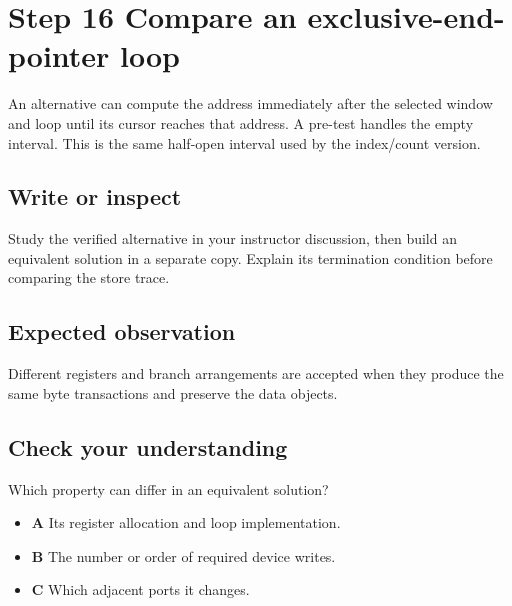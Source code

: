 \section{Step 16 Compare an exclusive-end-pointer
  loop}\label{005-seven-segment-counter-s16-step-16-compare-an-exclusive-end-pointer-loop}

An alternative can compute the address immediately after the selected
window and loop until its cursor reaches that address. A pre-test
handles the empty interval. This is the same half-open interval used by
the index/count version.

\subsection{Write or
  inspect}\label{005-seven-segment-counter-s16-write-or-inspect}

Study the verified alternative in your instructor discussion, then build
an equivalent solution in a separate copy. Explain its termination
condition before comparing the store trace.

\subsection{Expected
  observation}\label{005-seven-segment-counter-s16-expected-observation}

Different registers and branch arrangements are accepted when they
produce the same byte transactions and preserve the data objects.

\subsection{Check your
  understanding}\label{005-seven-segment-counter-s16-check-your-understanding}

Which property can differ in an equivalent solution?

\begin{itemize}
  \tightlist
  \item
        \textbf{A} Its register allocation and loop implementation.
  \item
        \textbf{B} The number or order of required device writes.
  \item
        \textbf{C} Which adjacent ports it changes.
\end{itemize}
